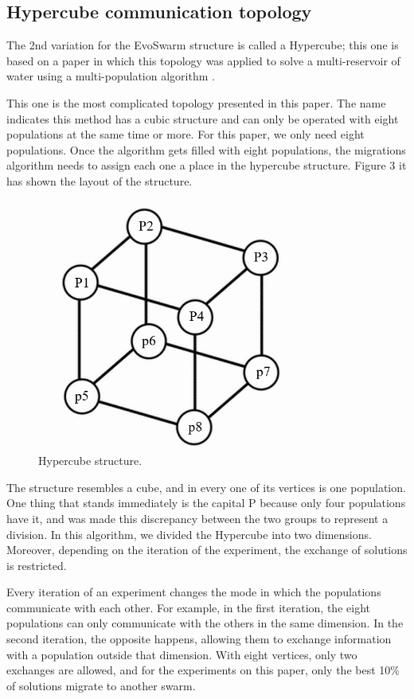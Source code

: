 \documentclass[runningheads]{llncs}
\begin{document}
\subsection{Hypercube communication topology}
The 2nd variation for the EvoSwarm structure is called a Hypercube; this one is based on a paper in which this topology was applied to solve a multi-reservoir of water using a multi-population algorithm \cite{b20}.  

This one is the most complicated topology presented in this paper. The name indicates this method has a cubic structure and can only be operated with eight populations at the same time or more. For this paper, we only need eight populations. Once the algorithm gets filled with eight populations, the migrations algorithm needs to assign each one a place in the hypercube structure. Figure 3 it has shown the layout of the structure.

\begin{figure}
\centering
{}
\includegraphics[width=0.35\linewidth]{Resources/F3.png}
\caption{Hypercube structure.}
\label{fig:example}
\end{figure}

The structure resembles a cube, and in every one of its vertices is one population. One thing that stands immediately is the capital P because only four populations have it, and was made this discrepancy between the two groups to represent a division. In this algorithm, we divided the Hypercube into two dimensions. Moreover, depending on the iteration of the experiment, the exchange of solutions is restricted.

Every iteration of an experiment changes the mode in which the populations communicate with each other. For example, in the first iteration, the eight populations can only communicate with the others in the same dimension. In the second iteration, the opposite happens, allowing them to exchange information with a population outside that dimension.   With eight vertices, only two exchanges are allowed, and for the experiments on this paper, only the best 10\% of solutions migrate to another swarm. 
\end{document}
